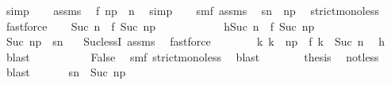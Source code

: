 \begin{isabellebody}
\ simp\isanewline
\ \ \isamarkupfalse%
\ assms{\isacharparenleft}{}{\isacharparenright}\ \isamarkupfalse%
\ {\isacartoucheopen}f\ n\isactrlsub p\ {\isacharless}\ n{\isacartoucheclose}\ \isamarkupfalse%
\ simp\isanewline
\ \ \isamarkupfalse%
\ smf\ assms{\isacharparenleft}{}{\isacharparenright}\ \isamarkupfalse%
\ {\isacharasterisk}{\isacharasterisk}{\isacharcolon}{\isacartoucheopen}sn\ {\isachargreater}\ n\isactrlsub p{\isacartoucheclose}\ \isamarkupfalse%
\ strict{\isacharunderscore}mono{\isacharunderscore}less\ \isamarkupfalse%
\ fastforce\isanewline
\ \ \isamarkupfalse%
\ {\isacartoucheopen}Suc\ n\ {\isasymle}\ f\ {\isacharparenleft}Suc\ n\isactrlsub p{\isacharparenright}{\isacartoucheclose}\isanewline
\ \ \isamarkupfalse%
\ {\isacharminus}\isanewline
\ \ \ \ \isacommand{{\isacharbraceleft}}\isamarkupfalse%
\ \isamarkupfalse%
\ h{\isacharcolon}{\isacartoucheopen}Suc\ n\ {\isachargreater}\ f\ {\isacharparenleft}Suc\ n\isactrlsub p{\isacharparenright}{\isacartoucheclose}\isanewline
\ \ \ \ \ \ \isamarkupfalse%
\ {\isacartoucheopen}Suc\ n\isactrlsub p\ {\isacharless}\ sn\ \isamarkupfalse%
\ {\isacharasterisk}{\isacharasterisk}\ Suc{\isacharunderscore}lessI\ assms{\isacharparenleft}{}{\isacharparenright}\ \isamarkupfalse%
\ fastforce\isanewline
\ \ \ \ \ \ \isamarkupfalse%
\ {\isacartoucheopen}{\isasymexists}k{\isachardot}\ k\ {\isachargreater}\ n\isactrlsub p\ {\isasymand}\ f\ k\ {\isacharless}\ Suc\ n{\isacartoucheclose}\ \isamarkupfalse%
\ h\ \isamarkupfalse%
\ blast\isanewline
\ \ \ \ \ \ \isamarkupfalse%
\ {\isacharasterisk}\ \isamarkupfalse%
\ False\ \isamarkupfalse%
\ smf\ strict{\isacharunderscore}mono{\isacharunderscore}less\ \isamarkupfalse%
\ blast\isanewline
\ \ \ \ \isacommand{{\isacharbraceright}}\isamarkupfalse%
\ \isamarkupfalse%
\ {\isacharquery}thesis\ \isamarkupfalse%
\ not{\isacharunderscore}less\ \isamarkupfalse%
\ blast\isanewline
\ \ \isamarkupfalse%
\isanewline
\ \ \isamarkupfalse%
\ {\isacartoucheopen}sn\ {\isasymle}\ Suc\ n\isactrlsub p{\isacartoucheclose}\ \isamarkupfalse%

\end{isabellebody}
